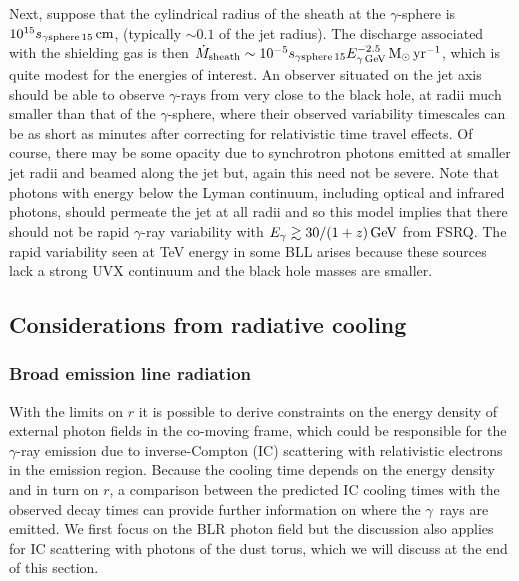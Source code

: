 \documentclass[twocolumn,linenumbers]{aastex62}
\newcommand{\Grays}{$\gamma$~rays\xspace}
\newcommand{\gray}{$\gamma$-ray\xspace}
\begin{document}
Next, suppose that the cylindrical radius of the sheath at the $\gamma$-sphere is $10^{15}s_{\gamma{\rm sphere}\,15}\,{\rm cm}$, (typically $\sim0.1$ of the jet radius). The discharge associated with the shielding gas is then $\dot M_{\rm sheath}\sim10^{-5}s_{\gamma{\rm sphere}\,15}E_{\gamma\,\rm GeV}^{-2.5}\,{\rm M}_\odot\,{\rm yr}^{-1}$, which is quite modest for the energies of interest. An observer situated on the jet axis should be able to observe $\gamma$-rays from very close to the black hole, at radii much smaller than that of the $\gamma$-sphere, where their observed variability timescales can be as short as minutes after correcting for relativistic time travel effects. Of course, there may be some opacity due to synchrotron photons emitted at smaller jet radii and beamed along the jet but, again this need not be severe. Note that photons with energy below the Lyman continuum, including optical and infrared photons, should permeate the jet at all radii and so this model implies that there should not be rapid \gray variability with $E_{\gamma}\gtrsim30/(1+z)\,{\rm GeV}$ from FSRQ. The rapid variability seen  at TeV energy in some BLL arises because
these sources lack a strong UVX continuum and the black hole masses are smaller.

\subsection{Considerations from radiative cooling}
\label{sec:tcool}
\subsubsection{Broad emission line radiation}
With the limits on $r$ it is possible to derive constraints on the energy density of external photon fields in the co-moving frame, which could be responsible for the \gray emission due to inverse-Compton (IC) scattering with relativistic electrons in the emission region. 
Because the cooling time depends on the energy density and in turn on $r$, a comparison between the predicted IC cooling times with the observed decay times can provide further information on where the \Grays are emitted.
We first focus on the BLR photon field but the discussion also applies for IC scattering with photons of the dust torus, which we will discuss at the end of this section.
\end{document}
